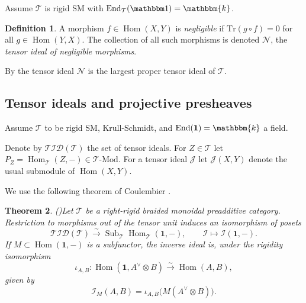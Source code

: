\documentclass[11pt,a4paper]{amsart}
\theoremstyle{plain}%
\newtheorem{lemma}{Lemma}[subsection]
\newtheorem{theorem}[lemma]{Theorem}
\theoremstyle{definition}
\newtheorem{definition}[lemma]{Definition}
\theoremstyle{remark}
\newcommand{\Hom}{\operatorname{Hom}}
\newcommand{\triv}{{\mathbbm 1}}
\newcommand{\End}{\operatorname{End}}
\newcommand{\kk}{\mathbbm{k}}
\newcommand{\one}{{\mathbf{1}}}
\newcommand{\TID}{\mathcal{TID}}
\newcommand{\I}{\mathcal{I}}
\begin{document}

Assume $\mathcal{T}$ is rigid SM with $\End_{\mathcal{T}}(\triv)=\kk$.
\begin{definition}\label{def:negligible}\cite{Barrett-Westbury} A morphism $f \in \Hom(X, Y)$ is \emph{negligible} if $\mathrm{Tr}(g \circ f) = 0$ for all $g \in \Hom(Y, X)$. The collection of all such morphisms is denoted $\mathcal{N}$, the \emph{tensor ideal of negligible morphisms}.
\end{definition}

By \cite{Andre-Kahn} the tensor ideal {$\mathcal{N}$} is the largest proper tensor ideal of $\mathcal{T}$. 



\subsection{Tensor ideals and projective presheaves}

Assume $\mathcal{T}$ to be rigid SM, Krull-Schmidt, and $\End(\one) = \kk$ a field. 

Denote by $\TID(\mathcal{T})$ the set of tensor ideals. For $Z \in \mathcal{T}$ let $P_{Z} = \Hom_{\mathcal{T}}(Z,-) \in \mathcal{T}\text{-}\mathrm{Mod}$. For a tensor ideal $\mathcal{J}$ let $\mathcal{J}(X,Y)$ denote the usual submodule of $\Hom(X,Y)$.


We use the following theorem of Coulembier
\cite[Theorem~3.1.1 and Proposition~3.2.1]{Coulembier-ideals}.

\begin{theorem}(\cite{Coulembier-ideals})\label{thm:Coulembier}
Let $\mathcal T$ be a right-rigid braided monoidal preadditive category. Restriction
to morphisms out of the tensor unit induces an isomorphism of posets
\[
 \mathcal{TID}(\mathcal T)
 \xrightarrow{\sim}
 \operatorname{Sub}_{\mathcal T}\Hom_{\mathcal T}(\one,-),
 \qquad
 \I\longmapsto \I(\one,-).
\]
If $M\subset\Hom(\one,-)$ is a subfunctor, the inverse ideal is, under the
rigidity isomorphism
\[
 \iota_{A,B}:\Hom(\one,A^{\vee}\otimes B)\xrightarrow{\sim}\Hom(A,B),
\]
given by
\[
 \I_M(A,B)=\iota_{A,B}\bigl(M(A^{\vee}\otimes B)\bigr).
\]
\end{theorem}
\end{document}
